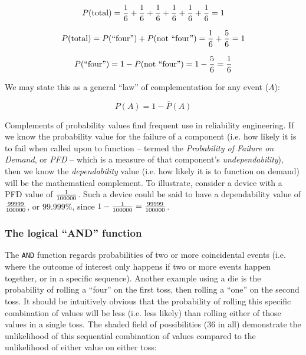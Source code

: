 $$P(\hbox{total}) = {1 \over 6} + {1 \over 6} + {1 \over 6} + {1 \over 6} + {1 \over 6} + {1 \over 6} = 1$$

$$P(\hbox{total}) = P(\hbox{``four''}) + P(\hbox{not ``four''}) = {1 \over 6} + {5 \over 6} = 1$$

$$P(\hbox{``four''}) = 1 - P(\hbox{not ``four''}) = 1 - {5 \over 6} = {1 \over 6}$$

We may state this as a general ``law'' of complementation for any event ($A$):

$$P(A) = 1 - \overline{P}(A)$$

Complements of probability values find frequent use in reliability engineering.  If we know the probability value for the failure of a component (i.e. how likely it is to fail when called upon to function -- termed the \textit{Probability of Failure on Demand}, or \textit{PFD} -- which is a measure of that component's \textit{undependability}), then we know the \textit{dependability} value (i.e. how likely it is to function on demand) will be the mathematical complement.  To illustrate, consider a device with a PFD value of $1 \over 100000$.  Such a device could be said to have a dependability value of $99999 \over 100000$, or 99.999\%, since $1 - {1 \over 100000} = {99999 \over 100000}$.    











\filbreak
\subsubsection{The logical ``AND'' function}

The \texttt{AND} function regards probabilities of two or more coincidental events (i.e. where the outcome of interest only happens if two or more events happen together, or in a specific sequence).  Another example using a die is the probability of rolling a ``four'' on the first toss, then rolling a ``one'' on the second toss.  It should be intuitively obvious that the probability of rolling this specific combination of values will be less (i.e. less likely) than rolling either of those values in a single toss.  The shaded field of possibilities (36 in all) demonstrate the unlikelihood of this sequential combination of values compared to the unlikelihood of either value on either toss:

